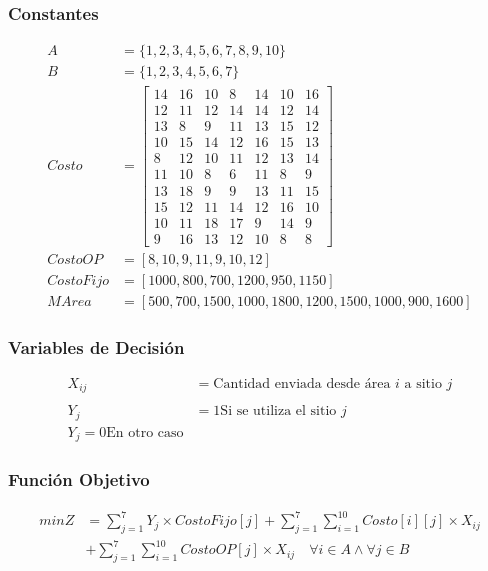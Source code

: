 \documentclass[a4paper,12pt]{article}
\begin{document}
\subsubsection{Constantes}
\begin{equation*}
\begin{split}
A&=\{1,2,3,4,5,6,7,8,9,10\}\\
B&=\{1,2,3,4,5,6,7\}\\
Costo &= \begin{bmatrix}
14 & 16 & 10 & 8 & 14 & 10 & 16\\
12 & 11 & 12 & 14 & 14 & 12 & 14\\
13 & 8 & 9 & 11 & 13 & 15 & 12\\
10 & 15 & 14 & 12 & 16 & 15 & 13\\
8 & 12 & 10 & 11 & 12 & 13 & 14\\
11 & 10 & 8 & 6 & 11 & 8 & 9\\
13 & 18 & 9 & 9 & 13 & 11 & 15\\
15 & 12 & 11 & 14 & 12 & 16 & 10\\
10 & 11 & 18 & 17 & 9 & 14 & 9\\
9 & 16 & 13 & 12 & 10 & 8 & 8
\end{bmatrix}\\
CostoOP&=[8,10,9,11,9,10,12]\\
CostoFijo&=[1000,800,700,1200,950,1150]\\
MArea&=[500,700,1500,1000,1800,1200,1500,1000,900,1600]
\end{split}
\end{equation*}
\subsubsection{Variables de Decisión}
\begin{equation*}
\begin{split}
	X_{ij}&=\text{Cantidad enviada desde área } i \text{ a sitio } j\\
	\\
	Y_j&=1 \text{Si se utiliza el sitio } j\\
	Y_j=0 \text{En otro caso}
\end{split}
\end{equation*}
\subsubsection{Función Objetivo}
\begin{equation*}
\begin{split}
	minZ &= \sum_{j=1}^{7}Y_j\times CostoFijo[j] + \sum_{j=1}^{7}\sum_{i=1}^{10}Costo[i][j]\times X_{ij}\\ 
	&+ \sum_{j=1}^{7}\sum_{i=1}^{10}CostoOP[j]\times X_{ij} \quad \forall i \in A \wedge \forall j \in B
\end{split}
\end{equation*}
\end{document}
